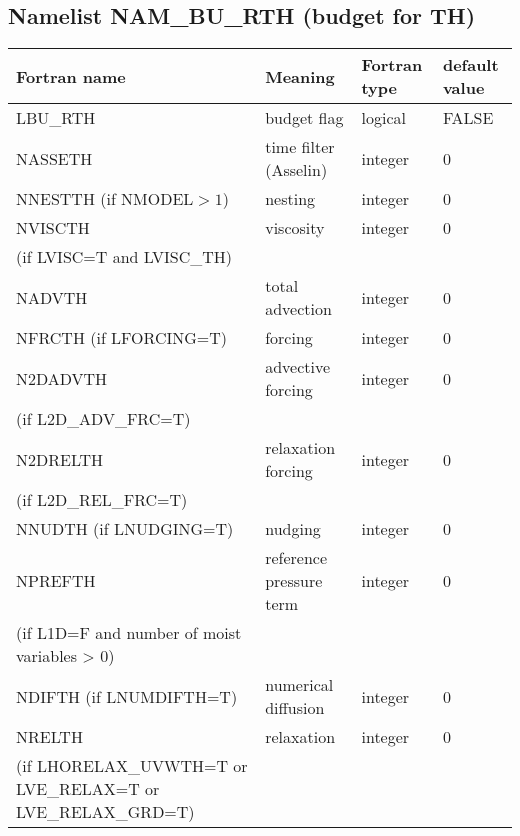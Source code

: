 \subsection{Namelist NAM\_BU\_RTH (budget for TH)}
\begin{longtable} {|p{}|p{}|>{\centering}p{}|p{}<{\centering}|}
\hline
Fortran name & Meaning & Fortran type & default value \\
\hline \hline
\endhead
LBU\_RTH & budget flag & logical & FALSE\index{LBU\_RTH!\innam{NAM\_BU\_RTH}} \\\hline
NASSETH  & time filter (Asselin)   & integer  &  0 \index{NASSETH!\innam{NAM\_BU\_RTH}} \\\hline
NNESTTH (if NMODEL$>1$) & nesting           & integer  &  0 \index{NNESTTH!\innam{NAM\_BU\_RTH}} \\\hline
NVISCTH  & viscosity         & integer  &  0 \index{NVISCTH!\innam{NAM\_BU\_RTH}}\\
(if LVISC=T and LVISC\_TH) &  &   &   \\\hline
NADVTH   & total advection   & integer  &  0 \index{NADVTH!\innam{NAM\_BU\_RTH}}\\\hline
NFRCTH (if LFORCING=T)   & forcing           & integer  &  0 \index{NFRCTH!\innam{NAM\_BU\_RTH}} \\\hline
N2DADVTH   &advective forcing           & integer  &  0 \index{N2DADVTH!\innam{NAM\_BU\_RTH}} \\ \nopagebreak
(if L2D\_ADV\_FRC=T) &  &   &   \\\hline
N2DRELTH   & relaxation forcing           & integer  &  0 \index{N2DRLETH!\innam{NAM\_BU\_RTH}} \\ \nopagebreak
(if L2D\_REL\_FRC=T) &  &   &   \\\hline
NNUDTH (if LNUDGING=T)  & nudging           & integer  &  0 \index{NNUDTH!\innam{NAM\_BU\_RTH}} \\\hline
NPREFTH  & reference pressure term  & integer  &  0 \index{NPREFTH!\innam{NAM\_BU\_RTH}} \\ 
(if L1D=F and number of moist variables > 0) &  &   &   \\\hline
NDIFTH (if LNUMDIFTH=T)   & numerical diffusion & integer  &  0 \index{NDIFTH!\innam{NAM\_BU\_RTH}}\\\hline
NRELTH   & relaxation        & integer  &  0 \index{NRELTH!\innam{NAM\_BU\_RTH}}\\ \nopagebreak
(if LHORELAX\_UVWTH=T or LVE\_RELAX=T or LVE\_RELAX\_GRD=T) &  &   &   \\\hline

\end{longtable}
